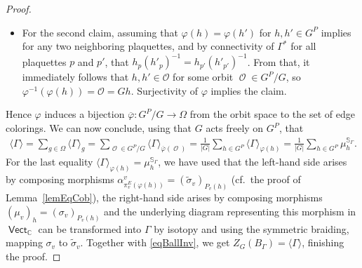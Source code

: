 \documentclass[pdftex]{sigma}
\DeclareMathOperator{\vect}{\mathsf{Vect}}
\DeclareMathOperator{\C}{\mathbb{C}}
\DeclareMathOperator{\calo}{\mathcal{O}}
\numberwithin{equation}{section}
\theoremstyle{definition}
\begin{document}
\begin{proof}
\begin{itemize}
 \item For the second claim, assuming that $\varphi(h) = \varphi(h')$ for $h, h' \in G^P$ implies for any two neighboring plaquettes, and by connectivity of $\Gamma^*$ for all plaquettes $p$ and $p'$, that $ h_{p}(h'_{p})^{-1} = h_{p'}(h'_{p'})^{-1}$. From that, it immediately follows that $h, h' \in \mathcal{O}$ for some orbit $\calo \in G^P/G$, so $\varphi^{-1}(\varphi(h)) = \mathcal{O} = Gh$. Surjectivity of $\varphi$ implies the claim.
\end{itemize}
Hence $\varphi$ induces a bijection $\overline{\varphi}\colon G^P/G \rightarrow \Omega$ from the orbit space to the set of edge colorings. We can now conclude, using that $G$ acts freely on $G^P$, that
\begin{align*}
 \langle \Gamma \rangle = \sum_{g \in \Omega}\langle \Gamma \rangle_g = \sum_{\calo \in G^P/G} \langle \Gamma \rangle_{\overline{\varphi}(\calo)} = \frac{1}{|G|}\sum_{h \in G^P}\langle \Gamma \rangle_{\varphi(h)} = \frac{1}{|G|}\sum_{h \in G^P}\mu_h^{\mathbb{S}_{\Gamma}}.
\end{align*}
For the last equality $\langle \Gamma \rangle_{\varphi(h)} = \mu_h^{\mathbb{S}_{\Gamma}}$, we have used that the left-hand side arises by composing morphisms $\alpha_{\pi_v^E(\varphi(h))}^v = (\widetilde{\sigma}_v)_{P_v(h)}$ (cf.\ the proof of Lemma~\ref{lemEqCob}),
the right-hand side arises by composing morphisms $(\mu_v)_h = (\sigma_v)_{P_v(h)}$ and the underlying diagram representing this morphism in $\vect_{\C}$ can be transformed into $\Gamma$ by isotopy and using the symmetric braiding, mapping $\sigma_v$ to $\widetilde{\sigma}_v$. Together with \eqref{eqBallInv}, we get $Z_G(B_{\Gamma}) = \langle \Gamma \rangle$, finishing the proof.
\end{proof}
\end{document}
